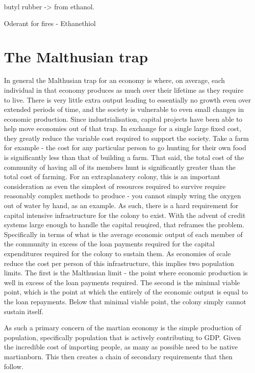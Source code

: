 \documentclass[10pt]{article}
\begin{document}
butyl rubber -> from ethanol.

Oderant for fires - Ethanethiol

\section{The Malthusian trap}
In general the Malthusian trap for an economy is where, on average, each individual in that economy produces as much over their lifetime as they require to live. There is very little extra output leading to essentially no growth even over extended periods of time, and the society is vulnerable to even small changes in economic production. Since industrialisation, capital projects have been able to help move economies out of that trap. In exchange for a single large fixed cost, they greatly reduce the variable cost required to support the society. Take a farm for example - the cost for any particular person to go hunting for their own food is significantly less than that of building a farm. That said, the total cost of the community of having all of its members hunt is significantly greater than the total cost of farming. For an extraplanatery colony, this is an important consideration as even the simplest of resources required to survive require reasonably complex methods to produce - you cannot simply wring the oxygen out of water by hand, as an example. As such, there is a hard requirement for capital intensive infrastructure for the colony to exist. With the advent of credit systems large enough to handle the capital reuqired, that reframes the problem. Specifically in terms of what is the average economic output of each member of the community in excess of the loan payments required for the capital expenditures required for the colony to sustain them. As economies of scale reduce the cost per person of this infrastructure, this implies two population limits. The first is the Malthusian limit - the point where economic production is well in excess of the loan payments required. The second is the minimal viable point, which is the point at which the entirely of the economic output is equal to the loan repayments. Below that minimal viable point, the colony simply cannot sustain itself.

As such a primary concern of the martian economy is the simple production of population, specifically population that is actively contributing to GDP. Given the incredible cost of importing people, as many as possible need to be native martianborn. This then creates a chain of secondary requirements that then follow.
\end{document}
